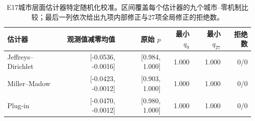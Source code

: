 \begin{table}[!htbp]
\caption{E17城市层面估计器特定随机化校准。区间覆盖每个估计器的九个城市--零机制比较；最后一列依次给出九项内部修正与27项全局修正的拒绝数。}
\label{tab:sup_estimator_nulls}
\centering
\footnotesize
\begin{tabular}{lrrrrr}
\toprule
\textbf{估计器} & \textbf{观测值减零均值} & \textbf{原始 $p$} & \textbf{最小 $q_9$} & \textbf{最小 $q_{27}$} & \textbf{拒绝数}\\
\midrule
Jeffreys--Dirichlet & [-0.0536, -0.0016] & [0.984, 1.000] & 1.000 & 1.000 & 0/0\\
Miller--Madow & [-0.0423, -0.0012] & [0.903, 1.000] & 1.000 & 1.000 & 0/0\\
Plug-in & [-0.0470, -0.0012] & [0.980, 1.000] & 1.000 & 1.000 & 0/0\\
\bottomrule
\end{tabular}
\end{table}
